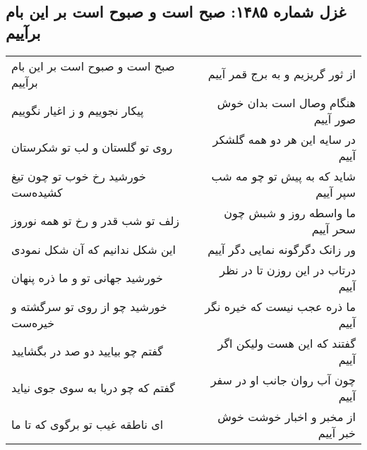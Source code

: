 \begin{center}
\section*{غزل شماره ۱۴۸۵: صبح است و صبوح است بر این بام برآییم}
\label{sec:1485}
\begin{longtable}{l p{0.5cm} r}
صبح است و صبوح است بر این بام برآییم
&&
از ثور گریزیم و به برج قمر آییم
\\
پیکار نجوییم و ز اغیار نگوییم
&&
هنگام وصال است بدان خوش صور آییم
\\
روی تو گلستان و لب تو شکرستان
&&
در سایه این هر دو همه گلشکر آییم
\\
خورشید رخ خوب تو چون تیغ کشیده‌ست
&&
شاید که به پیش تو چو مه شب سپر آییم
\\
زلف تو شب قدر و رخ تو همه نوروز
&&
ما واسطه روز و شبش چون سحر آییم
\\
این شکل ندانیم که آن شکل نمودی
&&
ور زانک دگرگونه نمایی دگر آییم
\\
خورشید جهانی تو و ما ذره پنهان
&&
درتاب در این روزن تا در نظر آییم
\\
خورشید چو از روی تو سرگشته و خیره‌ست
&&
ما ذره عجب نیست که خیره نگر آییم
\\
گفتم چو بیایید دو صد در بگشایید
&&
گفتند که این هست ولیکن اگر آییم
\\
گفتم که چو دریا به سوی جوی نیاید
&&
چون آب روان جانب او در سفر آییم
\\
ای ناطقه غیب تو برگوی که تا ما
&&
از مخبر و اخبار خوشت خوش خبر آییم
\\
\end{longtable}
\end{center}
